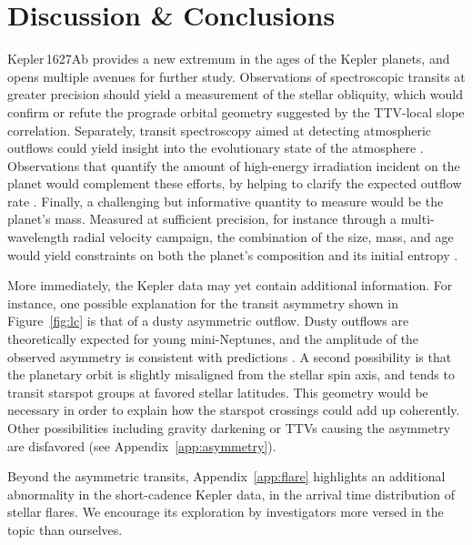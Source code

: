 \documentclass[12pt,modern,twocolumn,tighten,linenumbers,trackchanges]{aastex63}
\begin{document}
\section{Discussion \& Conclusions}
\label{sec:conc}


Kepler\,1627Ab provides a new extremum in the ages of the Kepler
planets, and opens multiple avenues for further study.  Observations
of spectroscopic transits at greater precision should yield a
measurement of the stellar obliquity, which would confirm or refute
the prograde orbital geometry suggested by the TTV-local slope
correlation.  Separately, transit spectroscopy aimed at detecting
atmospheric outflows could yield insight into the evolutionary state
of the atmosphere \citep[{\it
e.g.},][]{ehrenreich_giant_2015,spake_helium_2018,vissapragada_2020}.
Observations that quantify the amount of high-energy
irradiation incident on the planet would complement these efforts, by
helping to clarify the expected outflow rate \citep[{\it
e.g.},][]{poppenhaeger_2021}.  Finally, a challenging but informative
quantity to measure would be the planet's mass. Measured at
sufficient precision,
for instance through a multi-wavelength radial velocity campaign,
the combination of the size, mass, and age 
would yield constraints on both the planet's composition and its
initial entropy \citep{owen_constraining_2020}.

More immediately, the Kepler data may yet contain additional
information.  For instance, one possible explanation for the transit
asymmetry shown in Figure~\ref{fig:lc} is that of a dusty asymmetric
outflow.  
Dusty outflows are theoretically
expected for young mini-Neptunes, and the amplitude of the observed
asymmetry is consistent with predictions \citep{wang_dai_2019}.
A second possibility is that the planetary orbit is slightly
misaligned from the stellar spin axis, and tends to transit starspot
groups at favored stellar latitudes.  
This geometry would be necessary in order to
explain how the starspot crossings could add up coherently.
Other possibilities including
gravity darkening or TTVs causing the asymmetry are disfavored (see
Appendix~\ref{app:asymmetry}).  

Beyond the asymmetric transits, Appendix~\ref{app:flare}
highlights an additional abnormality in the short-cadence Kepler data, in the
arrival time distribution of stellar flares.  We encourage its
exploration by investigators more versed in the topic than ourselves.
\end{document}
